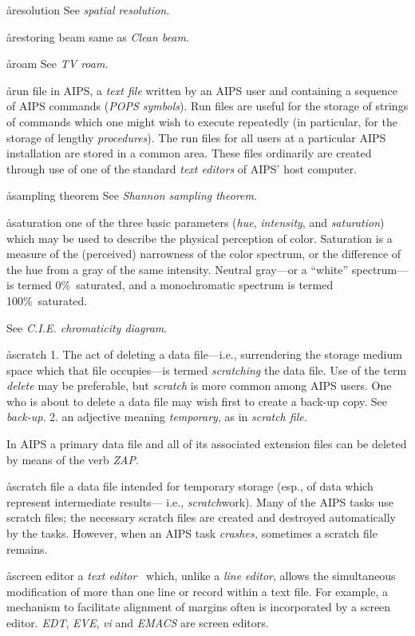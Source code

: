 \aa{resolution}
See {\it spatial resolution}. %

\aa{restoring beam} same as {\it Clean beam}.

\aa{roam} See {\it TV roam}.

\aa{run file}
in AIPS, a {\it text file} written by an AIPS user
and containing a sequence of AIPS commands ({\it POPS symbols}\/).
Run files are useful for the storage of strings of commands which
one might wish to execute repeatedly (in particular, for the
storage of lengthy {\it procedures}\/).
The run files for all users at a particular AIPS installation
are stored in a common area.
These files ordinarily are created through use of
one of the standard {\it text editors} of AIPS' host computer.

\aa{sampling theorem} See {\it Shannon sampling theorem}.

\aa{saturation}
one of the three basic parameters ({\it hue}, {\it intensity},
and {\it saturation}\/)
which may be used to describe the physical perception of color.
Saturation is a measure of the (perceived) narrowness of the
color spectrum, or the difference of the hue from a gray
of the same intensity.
Neutral gray---or a ``white'' spectrum---is termed 0\%\ saturated,
and a monochromatic spectrum is termed 100\%\ saturated.
\par
See {\it C.I.E. chromaticity diagram}.

\aa{scratch}
1. The act of deleting a data file---i.e., surrendering
the storage medium space which that
file occupies---is termed {\it scratching} the data file.
Use of the term {\it delete} may be preferable,
but {\it scratch} is more common among AIPS users.
One who is about to delete a data file
may wish first to create a back-up copy.
See {\it back-up}.
\xspace2. an adjective meaning {\it temporary},
as in {\it scratch file.}
\par
In AIPS a primary data file and all of its associated
extension files can be deleted by means of the
verb {\sl ZAP}.

\aa{scratch file}
a data file intended for temporary storage
(esp., of data which represent intermediate results---%
i.e., {\it scratch}\/work).
Many of the AIPS tasks use scratch files;
the necessary scratch files are created and destroyed automatically
by the tasks.
However, when an AIPS task {\it crashes,} sometimes a scratch file remains.

\aa{screen editor}
a {\it text editor} \qv\ which, unlike a {\it line editor}, allows
the simultaneous modification of more than one line or record
within a text file.  For example, a mechanism to facilitate alignment
of margins often is incorporated by a screen editor.
{\it EDT}, {\it EVE}, {\it vi} and {\it EMACS} are screen editors.

